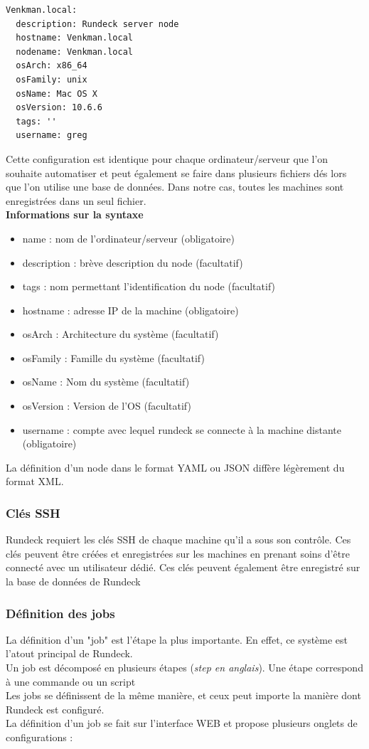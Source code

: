 \documentclass[12pt]{article}
\begin{document}
\begin{lstlisting}
Venkman.local:
  description: Rundeck server node
  hostname: Venkman.local
  nodename: Venkman.local
  osArch: x86_64
  osFamily: unix
  osName: Mac OS X
  osVersion: 10.6.6
  tags: ''
  username: greg
\end{lstlisting}

\vspace{0.5cm}
Cette configuration est identique pour chaque ordinateur/serveur que l'on souhaite automatiser et peut également se faire dans plusieurs fichiers dés lors que l'on utilise une base de données. Dans notre cas, toutes les machines sont enregistrées dans un seul fichier.
\vspace{0.5cm}
\\
\textbf{Informations sur la syntaxe}
\begin{itemize}
    \item name : nom de l'ordinateur/serveur (obligatoire)
    \item description : brève description du node (facultatif)
    \item tags : nom permettant l'identification du node (facultatif)
    \item hostname : adresse IP de la machine (obligatoire)
    \item osArch : Architecture du système (facultatif)
    \item osFamily : Famille du système (facultatif)
    \item osName : Nom du système (facultatif)
    \item osVersion : Version de l'OS (facultatif)
    \item username : compte avec lequel rundeck se connecte à la machine distante (obligatoire)
\end{itemize}
\vspace{0.5cm}
La définition d'un node dans le format YAML ou JSON diffère légèrement du format XML.

\subsubsection{Clés SSH}
Rundeck requiert les clés SSH de chaque machine qu'il a sous son contrôle. Ces clés peuvent être créées et enregistrées sur les machines en prenant soins d'être connecté avec un utilisateur dédié. Ces clés peuvent également être enregistré sur la base de données de Rundeck

\subsubsection{Définition des jobs}
La définition d'un "job" est l'étape la plus importante. En effet, ce système est l'atout principal de Rundeck.
\\
Un job est décomposé en plusieurs étapes (\textit{step en anglais}). Une étape correspond à une commande ou un script
\\
Les jobs se définissent de la même manière, et ceux peut importe la manière dont Rundeck est configuré.
\\
La définition d'un job se fait sur l'interface WEB et propose plusieurs onglets de configurations :
\end{document}
